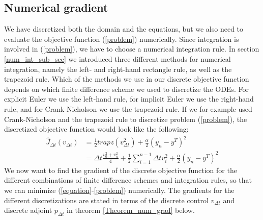 \subsection{Numerical gradient} \label{num_grad_sec1}
We have discretized both the domain and the equations, but we also need to evaluate the objective function (\ref{problem}) numerically. Since integration is involved in (\ref{problem}), we have to choose a numerical integration rule. In section \ref{num_int_sub_sec} we introduced three different methods for numerical integration, namely the left- and right-hand rectangle rule, as well as the trapezoid rule. Which of the methods we use in our discrete objective function depends on which finite difference scheme we used to discretize the ODEs. For explicit Euler we use the left-hand rule, for implicit Euler we use the right-hand rule, and for Crank-Nicholson we use the trapezoid rule. If we for example used Crank-Nicholson and the trapezoid rule to discretize problem (\ref{problem}), the discretized objective function would look like the following:
\begin{align}
\hat J_{\Delta t}(v_{\Delta t})&=\frac{1}{2} trapz(v_{\Delta t}^2)+ \frac{\alpha}{2}(y_n-y^T)^2 \\
&=\Delta t\frac{v_0^2+v_n^2}{4} + \frac{1}{2}\sum_{i=1}^{n-1} \Delta t v_i^2 + \frac{\alpha}{2}(y_n-y^T)^2 \label{disc f}
\end{align}
We now want to find the gradient of the discrete objective function for the different combinations of finite difference schemes and integration rules, so that we can minimize (\ref{equation}-\ref{problem}) numerically. The gradients for the different discretizations are stated in terms of the discrete control $v_{\Delta t}$ and discrete adjoint $p_{\Delta t}$ in theorem \ref{Theorem_num_grad} below.
